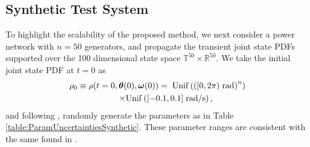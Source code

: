 \documentclass[10pt,twocolumn]{IEEEtran}
\begin{document}
\subsection{Synthetic Test System}\label{subsec:NumSimSynthetic}
To highlight the scalability of the proposed method, we next consider a power network with $n=50$ generators, and propagate the transient joint state PDFs supported over the 100 dimensional state space $\mathbb{T}^{50}\times\mathbb{R}^{50}$. We take the initial joint state PDF at $t=0$ as
\begin{multline}
\rho_{0}\equiv\rho(t=0,\bm{\theta}(0),\bm{\omega}(0)) = \;{\rm{Unif}}\left(\left([0,2\pi)\;\text{rad}\right)^{n}\right) \\
	\qquad\times {\rm{Unif}}\left([-0.1,0.1]\;\text{rad/s}\right),
\label{rho0synthetic}	
\end{multline}
and following \cite[Sec. 5]{dorfler2012synchronization}, randomly generate the parameters as in Table \ref{table:ParamUncertaintiesSynthetic}. These parameter ranges are consistent with the same found in \cite{sauerpai1998,andersonBook1977,kundurBook1994}.
\end{document}
